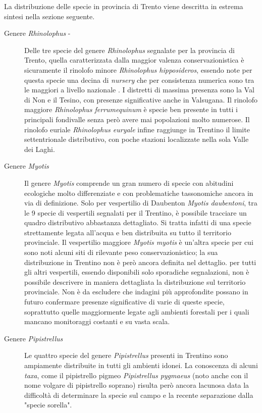 \documentclass[10pt,twoside,openany,x11names,svgnames,italian,a5paper,dvipsnames,table]{memoir}
\begin{document}
La distribuzione delle specie in provincia di Trento viene descritta in estrema sintesi nella sezione seguente.

\begin{description}
  \item [Genere \emph{Rhinolophus} -] 
  Delle tre specie del genere \emph{Rhinolophus} segnalate per la provincia di Trento, quella caratterizzata dalla maggior valenza conservazionistica è sicuramente il rinolofo minore \emph{Rhinolophus hipposideros}, essendo note per questa specie una decina di \emph{nursery} che per consistenza numerica sono tra le maggiori a livello nazionale \cite{GIRC04}. I distretti di massima presenza sono la Val di Non e il Tesino, con presenze significative anche in Valsugana. Il rinolofo maggiore \emph{Rhinolophus ferrumequinum} è specie ben presente in tutti i principali fondivalle senza però avere mai popolazioni molto numerose. Il rinolofo euriale \emph{Rhinolophus euryale} infine raggiunge in Trentino il limite settentrionale distributivo, con poche stazioni localizzate nella sola Valle dei Laghi.
  \item [Genere \emph{Myotis}]
  Il genere \emph{Myotis} comprende un gran numero di specie con abitudini ecologiche molto differenziate e con problematiche tassonomiche ancora in via di definizione. Solo per vespertilio di Daubenton \emph{Myotis daubentoni}, tra le 9 specie di vespertili segnalati per il Trentino, è possibile tracciare un quadro distributivo abbastanza dettagliato. Si tratta infatti di una specie strettamente legata all’acqua e ben distribuita su tutto il territorio provinciale. Il vespertilio maggiore \emph{Myotis myotis} è un’altra specie per cui sono noti alcuni siti di rilevante peso conservazionistico; la sua distribuzione in Trentino non è però ancora definita nel dettaglio. per tutti gli altri vespertili, essendo disponibili solo sporadiche segnalazioni, non è possibile descrivere in maniera dettagliata la distribuzione sul territorio provinciale. Non è da escludere che indagini più approfondite possano in futuro confermare presenze significative di varie di queste specie, soprattutto quelle maggiormente legate agli ambienti forestali per i quali mancano monitoraggi costanti e su vasta scala.
  \item [Genere \emph{Pipistrellus}]
  Le quattro specie del genere \emph{Pipistrellus} presenti in Trentino sono ampiamente distribuite in tutti gli ambienti idonei. La conoscenza di alcuni \emph{taxa}, come il pipistrello pigmeo \emph{Pipistrellus pygmaeus} (noto anche con il nome volgare di pipistrello soprano) risulta però ancora lacunosa data la difficoltà di determinare la specie sul campo e la recente separazione dalla "specie sorella".

\end{description}
\end{document}

